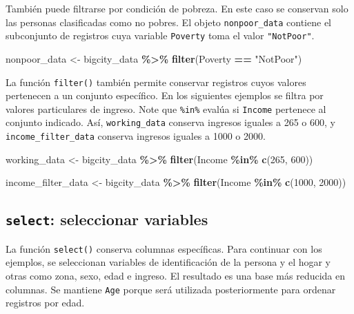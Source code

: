\documentclass[
  spanish,
  12pt,
]{book}
\newenvironment{Shaded}{\begin{snugshade}}{\end{snugshade}}
\newcommand{\DecValTok}[1]{\textcolor[rgb]{0.00,0.00,0.81}{#1}}
\newcommand{\FunctionTok}[1]{\textcolor[rgb]{0.13,0.29,0.53}{\textbf{#1}}}
\newcommand{\NormalTok}[1]{#1}
\newcommand{\OtherTok}[1]{\textcolor[rgb]{0.56,0.35,0.01}{#1}}
\newcommand{\SpecialCharTok}[1]{\textcolor[rgb]{0.81,0.36,0.00}{\textbf{#1}}}
\newcommand{\StringTok}[1]{\textcolor[rgb]{0.31,0.60,0.02}{#1}}
\begin{document}
También puede filtrarse por condición de pobreza. En este caso se conservan solo las personas clasificadas como no pobres. El objeto \texttt{nonpoor\_data} contiene el subconjunto de registros cuya variable \texttt{Poverty} toma el valor \texttt{"NotPoor"}.

\begin{Shaded}
\begin{Highlighting}[]
\NormalTok{nonpoor\_data }\OtherTok{\textless{}{-}}\NormalTok{ bigcity\_data }\SpecialCharTok{\%\textgreater{}\%}
  \FunctionTok{filter}\NormalTok{(Poverty }\SpecialCharTok{==} \StringTok{"NotPoor"}\NormalTok{)}
\end{Highlighting}
\end{Shaded}

La función \texttt{filter()} también permite conservar registros cuyos valores pertenecen a un conjunto específico. En los siguientes ejemplos se filtra por valores particulares de ingreso. Note que \texttt{\%in\%} evalúa si \texttt{Income} pertenece al conjunto indicado. Así, \texttt{working\_data} conserva ingresos iguales a 265 o 600, y \texttt{income\_filter\_data} conserva ingresos iguales a 1000 o 2000.

\begin{Shaded}
\begin{Highlighting}[]
\NormalTok{working\_data }\OtherTok{\textless{}{-}}\NormalTok{ bigcity\_data }\SpecialCharTok{\%\textgreater{}\%}
  \FunctionTok{filter}\NormalTok{(Income }\SpecialCharTok{\%in\%} \FunctionTok{c}\NormalTok{(}\DecValTok{265}\NormalTok{, }\DecValTok{600}\NormalTok{))}

\NormalTok{income\_filter\_data }\OtherTok{\textless{}{-}}\NormalTok{ bigcity\_data }\SpecialCharTok{\%\textgreater{}\%}
  \FunctionTok{filter}\NormalTok{(Income }\SpecialCharTok{\%in\%} \FunctionTok{c}\NormalTok{(}\DecValTok{1000}\NormalTok{, }\DecValTok{2000}\NormalTok{))}
\end{Highlighting}
\end{Shaded}

\subsection{\texorpdfstring{\texttt{select}: seleccionar variables}{select: seleccionar variables}}\label{select-seleccionar-variables}

La función \texttt{select()} conserva columnas específicas. Para continuar con los ejemplos, se seleccionan variables de identificación de la persona y el hogar y otras como zona, sexo, edad e ingreso. El resultado es una base más reducida en columnas. Se mantiene \texttt{Age} porque será utilizada posteriormente para ordenar registros por edad.
\end{document}
